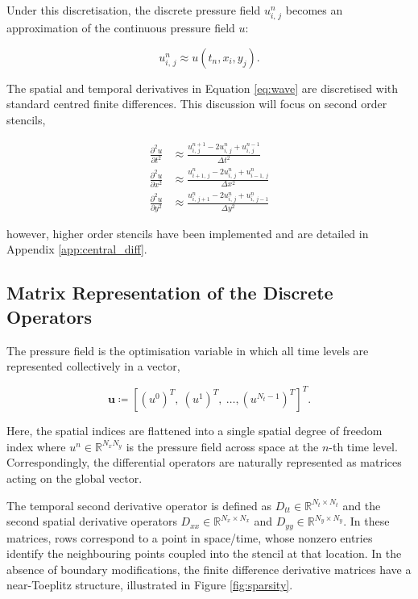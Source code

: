 \documentclass[final-report]{report-template}
\newcommand{\utt}{\frac {\partial^2 u} {\partial t^2}}
\begin{document}
Under this discretisation, the discrete pressure field $u^n_{i,\, j}$ becomes an approximation of the continuous pressure field $u$:

\begin{equation}
    u^n_{i,\, j} \approx u(t_n, x_i, y_j).
    \label{eq:approxu}
\end{equation}

The spatial and temporal derivatives in Equation \eqref{eq:wave} are discretised with standard centred finite differences. This discussion will focus on second order stencils,

\begin{align}
    \utt &\approx \frac {u^{n+1}_{i,\, j} - 2u^{n}_{i,\, j} + u^{n-1}_{i,\, j}} {\Delta t^2} \label{eq:uttcd}\\[2pt]
    \frac{\partial^2 u}{\partial x^2} &\approx \frac {u^{n}_{i + 1,\, j} - 2u^{n}_{i,\, j} + u^{n}_{i-1,\, j}} {\Delta x^2} \label{eq:uxxcd}\\[2pt]
    \frac{\partial^2 u}{\partial y^2} &\approx \frac {u^{n}_{i,\, j+1} - 2u^{n}_{i,\, j} + u^{n}_{i,\, j-1}} {\Delta y^2} \label{eq:uyycd}
\end{align}

however, higher order stencils have been implemented and are detailed in Appendix \ref{app:central_diff}.

\subsection{Matrix Representation of the Discrete Operators}
\label{subsubsect:disc_op}

The pressure field is the optimisation variable in which all time levels are represented collectively in a vector, 

\begin{equation}
    \mathbf{u} \coloneqq \left[\left(u^0\right)^T,\ \left(u^1\right)^T,\ \dots,\left(u^{N_t - 1}\right)^T\right]^T.
    \label{eq:u_vec}
\end{equation} 

Here, the spatial indices are flattened into a single spatial degree of freedom index where $u^n \in \mathbb{R}^{N_x N_y}$ is the pressure field across space at the $n$-th time level. Correspondingly, the differential operators are naturally represented as matrices acting on the global vector.

The temporal second derivative operator is defined as $D_{tt} \in \mathbb{R}^{N_t \times N_t}$ and the second spatial derivative operators $D_{xx} \in \mathbb{R}^{N_x \times N_x}$ and $D_{yy} \in \mathbb{R}^{N_y \times N_y}$. In these matrices, rows correspond to a point in space/time, whose nonzero entries identify the neighbouring points coupled into the stencil at that location. In the absence of boundary modifications, the finite difference derivative matrices have a near-Toeplitz structure, illustrated in Figure \ref{fig:sparsity}.
\end{document}

